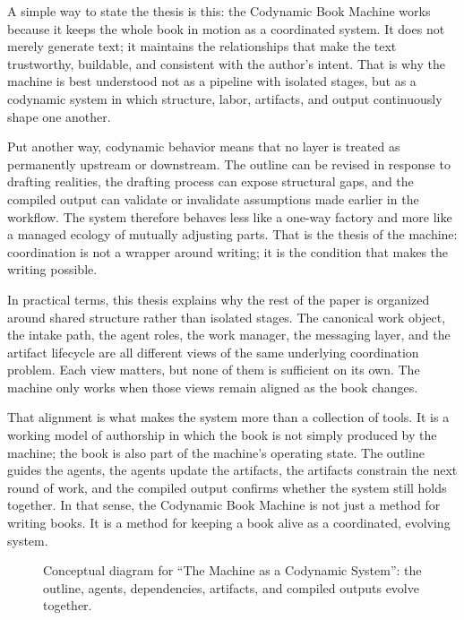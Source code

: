 A simple way to state the thesis is this: the Codynamic Book Machine works because it keeps the whole book in motion as a coordinated system. It does not merely generate text; it maintains the relationships that make the text trustworthy, buildable, and consistent with the author's intent. That is why the machine is best understood not as a pipeline with isolated stages, but as a codynamic system in which structure, labor, artifacts, and output continuously shape one another.

Put another way, codynamic behavior means that no layer is treated as permanently upstream or downstream. The outline can be revised in response to drafting realities, the drafting process can expose structural gaps, and the compiled output can validate or invalidate assumptions made earlier in the workflow. The system therefore behaves less like a one-way factory and more like a managed ecology of mutually adjusting parts. That is the thesis of the machine: coordination is not a wrapper around writing; it is the condition that makes the writing possible.

In practical terms, this thesis explains why the rest of the paper is organized around shared structure rather than isolated stages. The canonical work object, the intake path, the agent roles, the work manager, the messaging layer, and the artifact lifecycle are all different views of the same underlying coordination problem. Each view matters, but none of them is sufficient on its own. The machine only works when those views remain aligned as the book changes.

That alignment is what makes the system more than a collection of tools. It is a working model of authorship in which the book is not simply produced by the machine; the book is also part of the machine's operating state. The outline guides the agents, the agents update the artifacts, the artifacts constrain the next round of work, and the compiled output confirms whether the system still holds together. In that sense, the Codynamic Book Machine is not just a method for writing books. It is a method for keeping a book alive as a coordinated, evolving system.

\begin{figure}[htbp]
\centering

\caption{Conceptual diagram for ``The Machine as a Codynamic System'': the outline, agents, dependencies, artifacts, and compiled outputs evolve together.}
\end{figure}
